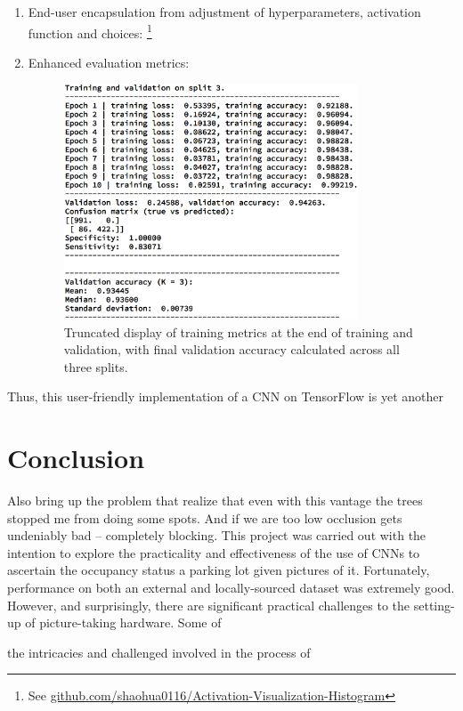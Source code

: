 \documentclass[a4paper, 11pt]{article} %
\begin{document}
\begin{enumerate}
\begin{figure}[H]
			\end{figure}
			\item End-user encapsulation from adjustment of hyperparameters, 
			activation function and choices: \cite{selu-motivation} 
			\footnote{See 
			\hyperlink{https://github.com/shaohua0116/Activation-Visualization-Histogram}
				{github.com/shaohua0116/Activation-Visualization-Histogram}}
			\item Enhanced evaluation metrics:
			\begin{figure}[H]
				\centering
				\includegraphics[height=7cm]{figures/floydhub_results_example}
				\caption{Truncated display of training metrics at the end of 
				training and validation, with final validation accuracy 
				calculated across all three splits.}
			\end{figure}
		\end{enumerate}
		Thus, this user-friendly implementation of a CNN on TensorFlow is yet 
		another 

\section{Conclusion}
	Also bring up the problem that realize that even with this vantage the 
	trees stopped me from doing some spots. And if we are too low occlusion 
	gets undeniably bad -- completely blocking.
	This project was carried out with the intention to explore the practicality 
	and effectiveness of the use of CNNs to ascertain the occupancy status a 
	parking lot given pictures of it. Fortunately, performance on both an 
	external and locally-sourced dataset was extremely good. However, and 
	surprisingly, there are significant practical challenges to the setting-up 
	of picture-taking hardware. Some of 
	
	the intricacies and challenged involved in the process of 
\end{document}
